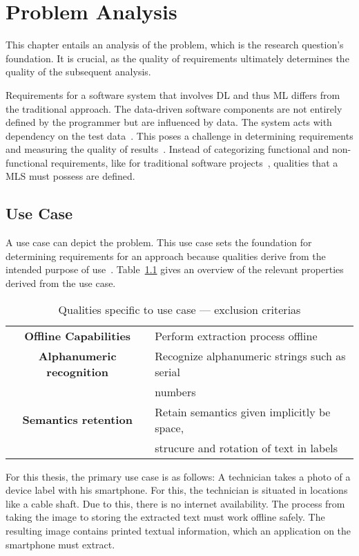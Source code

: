 \chapter{Problem Analysis}\label{ch:problem}
This chapter entails an analysis of the problem, which is the research question's foundation.
It is crucial, as the quality of requirements ultimately determines the quality of the
subsequent analysis.

Requirements for a software system that involves \ac{DL} and thus \ac{ML} differs from
the traditional approach. The data-driven software components are not entirely defined by the
programmer but are influenced by data.
The system acts with dependency on the test data~\citep{siebert_construction_2021}.
This poses a challenge in determining requirements and measuring the quality of
results~\citep{nakamichi_requirements-driven_2020}.
Instead of categorizing functional and non-functional requirements, like for traditional
software projects~\citep{zowghi_requirements_2014}, qualities that a \ac{MLS} must possess
are defined.

\section{Use Case}
A use case can depict the problem.
This use case sets the foundation for determining requirements for an
approach because qualities derive from the intended purpose of
use~\citep{siebert_construction_2021}.
Table~\ref{tb:useCaseQualities} gives an overview of the relevant properties derived
from the use case.
\begin{table}[ht]
    \centering\scriptsize
    \begin{tabular}{c l}
        \textbf{Offline Capabilities} & Perform extraction process offline \\
        \textbf{Alphanumeric recognition}    & Recognize alphanumeric strings such as serial \\
                                    & numbers \\
        \textbf{Semantics retention} & Retain semantics given implicitly be space, \\
                            & strucure and rotation of text in labels \\
    \end{tabular}
    \caption{Qualities specific to use case --- exclusion criterias\label{tb:useCaseQualities}}
\end{table}
For this thesis, the primary use case is as follows:
A technician takes a photo of a device label with his smartphone.
For this, the technician is situated in locations like a cable shaft.
Due to this, there is no internet availability.
The process from taking the image to storing the extracted text must work offline safely.
The resulting image contains printed textual information, which an application on the smartphone must
extract.

